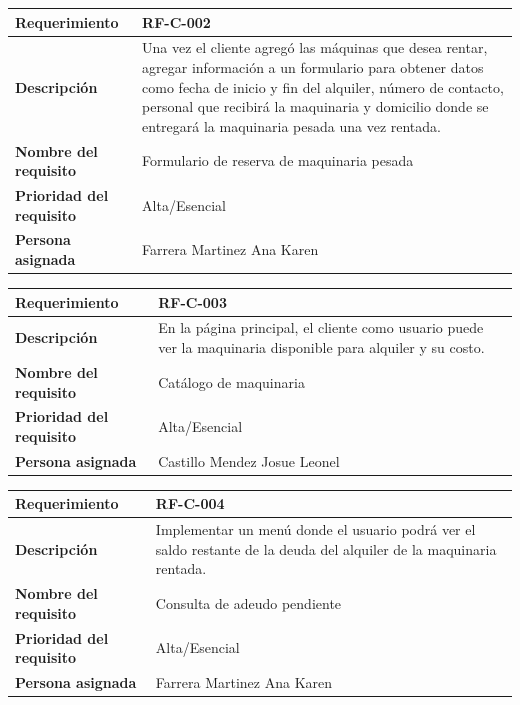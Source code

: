 \documentclass{article}
\begin{document}
\begin{center}
\begin{tabular}{|p{3cm}|p{9cm}|}
\hline
\textbf{Requerimiento} & RF-C-002 \\
\hline
\textbf{Descripción} & Una vez el cliente agregó las máquinas que desea rentar, agregar información a un formulario para obtener datos como fecha de inicio y fin del alquiler, número de contacto, personal que recibirá la maquinaria y domicilio donde se entregará la maquinaria pesada una vez rentada. \\
\hline
\textbf{Nombre del requisito} & Formulario de reserva de maquinaria pesada \\
\hline
\textbf{Prioridad del requisito} & Alta/Esencial \\
\hline
\textbf{Persona asignada} & Farrera Martinez Ana Karen \\
\hline
\end{tabular}
\end{center}

\begin{center}
\begin{tabular}{|p{3cm}|p{9cm}|}
\hline
\textbf{Requerimiento} & RF-C-003 \\
\hline
\textbf{Descripción} & En la página principal, el cliente como usuario puede ver la maquinaria disponible para alquiler y su costo. \\
\hline
\textbf{Nombre del requisito} & Catálogo de maquinaria \\
\hline
\textbf{Prioridad del requisito} & Alta/Esencial \\
\hline
\textbf{Persona asignada} & Castillo Mendez Josue Leonel \\
\hline
\end{tabular}
\end{center}

\begin{center}
\begin{tabular}{|p{3cm}|p{9cm}|}
\hline
\textbf{Requerimiento} & RF-C-004 \\
\hline
\textbf{Descripción} & Implementar un menú donde el usuario podrá ver el saldo restante de la deuda del alquiler de la maquinaria rentada. \\
\hline
\textbf{Nombre del requisito} & Consulta de adeudo pendiente \\
\hline
\textbf{Prioridad del requisito} & Alta/Esencial \\
\hline
\textbf{Persona asignada} & Farrera Martinez Ana Karen \\
\hline
\end{tabular}
\end{center}
\end{document}
